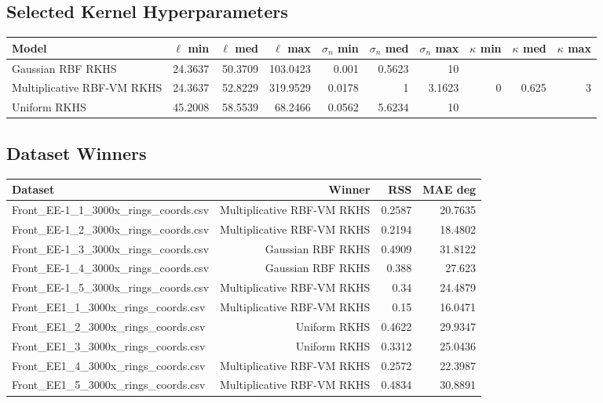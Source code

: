 \documentclass[10pt]{article}
\begin{document}
\subsection{Selected Kernel Hyperparameters}
\begin{center}
\begin{tabular}{lrrrrrrrrr}
\toprule
Model & $\ell$ min & $\ell$ med & $\ell$ max & $\sigma_n$ min & $\sigma_n$ med & $\sigma_n$ max & $\kappa$ min & $\kappa$ med & $\kappa$ max \\
\midrule
Gaussian RBF RKHS & 24.3637 & 50.3709 & 103.0423 & 0.001 & 0.5623 & 10 &  &  &  \\
Multiplicative RBF-VM RKHS & 24.3637 & 52.8229 & 319.9529 & 0.0178 & 1 & 3.1623 & 0 & 0.625 & 3 \\
Uniform RKHS & 45.2008 & 58.5539 & 68.2466 & 0.0562 & 5.6234 & 10 &  &  &  \\
\bottomrule
\end{tabular}
\end{center}

\subsection{Dataset Winners}
\begin{center}
\begin{tabular}{lrrr}
\toprule
Dataset & Winner & RSS & MAE deg \\
\midrule
Front\_EE-1\_1\_3000x\_rings\_coords.csv & Multiplicative RBF-VM RKHS & 0.2587 & 20.7635 \\
Front\_EE-1\_2\_3000x\_rings\_coords.csv & Multiplicative RBF-VM RKHS & 0.2194 & 18.4802 \\
Front\_EE-1\_3\_3000x\_rings\_coords.csv & Gaussian RBF RKHS & 0.4909 & 31.8122 \\
Front\_EE-1\_4\_3000x\_rings\_coords.csv & Gaussian RBF RKHS & 0.388 & 27.623 \\
Front\_EE-1\_5\_3000x\_rings\_coords.csv & Multiplicative RBF-VM RKHS & 0.34 & 24.4879 \\
Front\_EE1\_1\_3000x\_rings\_coords.csv & Multiplicative RBF-VM RKHS & 0.15 & 16.0471 \\
Front\_EE1\_2\_3000x\_rings\_coords.csv & Uniform RKHS & 0.4622 & 29.9347 \\
Front\_EE1\_3\_3000x\_rings\_coords.csv & Uniform RKHS & 0.3312 & 25.0436 \\
Front\_EE1\_4\_3000x\_rings\_coords.csv & Multiplicative RBF-VM RKHS & 0.2572 & 22.3987 \\
Front\_EE1\_5\_3000x\_rings\_coords.csv & Multiplicative RBF-VM RKHS & 0.4834 & 30.8891 \\
\bottomrule
\end{tabular}
\end{center}
\end{document}
